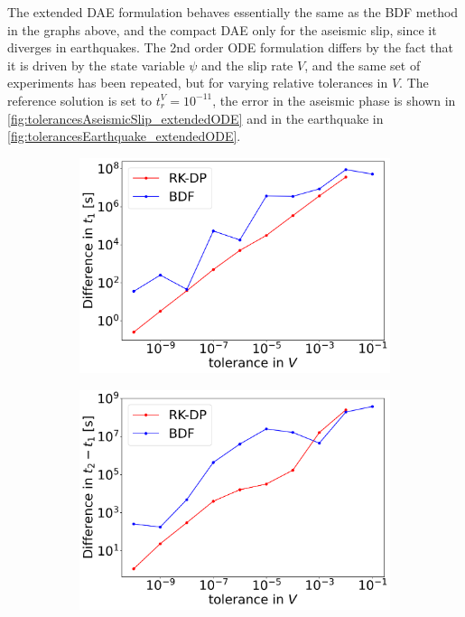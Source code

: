 The extended DAE formulation behaves essentially the same as the BDF method in the graphs above, and the compact DAE only for the aseismic slip, since it diverges in earthquakes. The 2nd order ODE formulation differs by the fact that it is driven by the state variable $\psi$ and the slip rate $V$, and the same set of experiments has been repeated, but for varying relative tolerances in $V$. The reference solution is set to $t_r^V=10^{-11}$, the error in the aseismic phase is shown in \autoref{fig:tolerancesAseismicSlip_extendedODE} and in the earthquake in \autoref{fig:tolerancesEarthquake_extendedODE}.
\begin{figure}[H]
	\centering
	\begin{subfigure}[t]{0.32\textwidth}
		\centering
		\includegraphics[width=1\textwidth]{images/TANDEMextendedODEDifferentTolerancesSize101_AS_FirstEarthquakeTimeDiff.png}
	\end{subfigure} 
	\begin{subfigure}[t]{0.32\textwidth}
		\centering
		\includegraphics[width=1\textwidth]{images/TANDEMextendedODEDifferentTolerancesSize101_AS_PeriodDiff.png}

\end{subfigure}
\end{figure}
